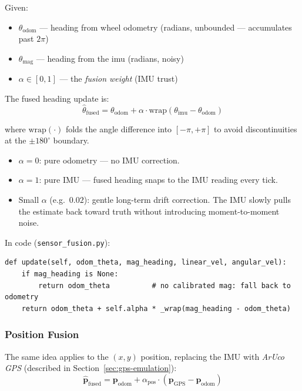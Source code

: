 \documentclass[12pt,letterpaper]{article}
\begin{document}
Given:
\begin{itemize}
  \item $\theta_{\text{odom}}$ --- heading from wheel odometry (radians,
        unbounded --- accumulates past $2\pi$)
  \item $\theta_{\text{mag}}$ --- heading from the imu (radians,
        noisy)
  \item $\alpha \in [0, 1]$ --- the \emph{fusion weight} (IMU trust)
\end{itemize}

The fused heading update is:
\begin{equation}
  \hat{\theta}_{\text{fused}}
    = \theta_{\text{odom}}
    + \alpha \cdot \mathrm{wrap}\!\left(\theta_{\text{imu}} - \theta_{\text{odom}}\right)
  \label{eq:cf-heading}
\end{equation}

where $\mathrm{wrap}(\cdot)$ folds the angle difference into $[-\pi, +\pi]$
to avoid discontinuities at the $\pm 180^\circ$ boundary.

\begin{itemize}
  \item $\alpha = 0$: pure odometry --- no IMU correction.
  \item $\alpha = 1$: pure IMU --- fused heading snaps to the
        IMU reading every tick.
  \item Small $\alpha$ (e.g.\ $0.02$): gentle long-term drift correction.
        The IMU slowly pulls the estimate back toward truth without
        introducing moment-to-moment noise.
\end{itemize}

In code (\texttt{sensor\_fusion.py}):
\begin{lstlisting}[style=python, caption={ComplementaryFilter.update() in sensor\_fusion.py}]
def update(self, odom_theta, mag_heading, linear_vel, angular_vel):
    if mag_heading is None:
        return odom_theta          # no calibrated mag: fall back to odometry
    return odom_theta + self.alpha * _wrap(mag_heading - odom_theta)
\end{lstlisting}

\subsubsection*{Position Fusion}

The same idea applies to the $(x, y)$ position, replacing the IMU
with \emph{ArUco GPS} (described in Section~\ref{sec:gps-emulation}):
\begin{equation}
  \hat{\mathbf{p}}_{\text{fused}}
    = \mathbf{p}_{\text{odom}}
    + \alpha_{\text{pos}} \cdot \left(\mathbf{p}_{\text{GPS}} - \mathbf{p}_{\text{odom}}\right)
  \label{eq:cf-position}
\end{equation}
\end{document}
